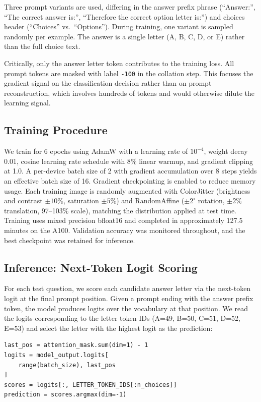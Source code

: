 \documentclass[11pt]{article}
\begin{document}
Three prompt variants are used, differing in the answer prefix phrase (``Answer:'', ``The correct answer is:'', ``Therefore the correct option letter is:'') and choices header (``Choices'' vs.\ ``Options''). During training, one variant is sampled randomly per example. The answer is a single letter (A, B, C, D, or E) rather than the full choice text.

Critically, only the answer letter token contributes to the training loss. All prompt tokens are masked with label \texttt{-100} in the collation step. This focuses the gradient signal on the classification decision rather than on prompt reconstruction, which involves hundreds of tokens and would otherwise dilute the learning signal.

\subsection{Training Procedure}

We train for 6 epochs using AdamW with a learning rate of $10^{-4}$, weight decay 0.01, cosine learning rate schedule with 8\% linear warmup, and gradient clipping at 1.0. A per-device batch size of 2 with gradient accumulation over 8 steps yields an effective batch size of 16. Gradient checkpointing is enabled to reduce memory usage. Each training image is randomly augmented with ColorJitter (brightness and contrast $\pm 10\%$, saturation $\pm 5\%$) and RandomAffine ($\pm 2^\circ$ rotation, $\pm 2\%$ translation, 97--103\% scale), matching the distribution applied at test time. Training uses mixed precision bfloat16 and completed in approximately 127.5 minutes on the A100. Validation accuracy was monitored throughout, and the best checkpoint was retained for inference.

\subsection{Inference: Next-Token Logit Scoring}

For each test question, we score each candidate answer letter via the next-token logit at the final prompt position. Given a prompt ending with the answer prefix token, the model produces logits over the vocabulary at that position. We read the logits corresponding to the letter token IDs (A=49, B=50, C=51, D=52, E=53) and select the letter with the highest logit as the prediction:

\begin{verbatim}
last_pos = attention_mask.sum(dim=1) - 1
logits = model_output.logits[
    range(batch_size), last_pos
]
scores = logits[:, LETTER_TOKEN_IDS[:n_choices]]
prediction = scores.argmax(dim=-1)
\end{verbatim}
\end{document}

